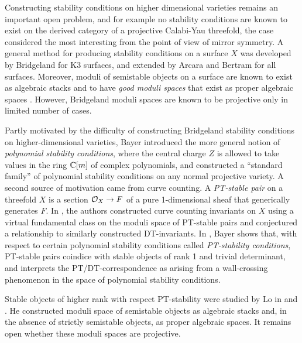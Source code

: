 Constructing stability conditions on higher dimensional varieties remains an important open problem, and for example no stability conditions are known to exist on the derived category of a projective Calabi-Yau threefold, the case considered the most interesting from the point of view of mirror symmetry. A general method for producing stability conditions on a surface $X$ was developed by Bridgeland \cite{bridgelandK3} for K3 surfaces, and extended by Arcara and Bertram \cite{ABL13} for all surfaces. Moreover, moduli of semistable objects on a surface are known to exist as algebraic stacks \cite{toda08} and to have \textit{good moduli spaces} that exist as proper algebraic spaces \cite[Theorem 7.25, Example 7.27]{AHLH}. However, Bridgeland moduli spaces are known to be projective only in limited number of cases.

Partly motivated by the difficulty of constructing Bridgeland stability conditions on higher-dimensional varieties, Bayer \cite{bayer-polynomial} introduced the more general notion of \textit{polynomial stability conditions}, where the central charge $Z$ is allowed to take values in the ring $\mathbb{C}[m]$ of complex polynomials, and constructed a ``standard family'' of polynomial stability conditions on any normal projective variety. A second source of motivation came from curve counting. A \textit{PT-stable pair} on a threefold $X$ is a section $\mathcal{O}_X \to F$ of a pure 1-dimensional sheaf that generically generates $F$. In \cite{PT}, the authors constructed curve counting invariants on $X$ using a virtual fundamental class on the moduli space of PT-stable pairs and conjectured a relationship to similarly constructed DT-invariants. In \cite{bayer-polynomial}, Bayer shows that, with respect to certain polynomial stability conditions called \textit{PT-stability conditions}, PT-stable pairs coindice with stable objects of rank 1 and trivial determinant, and interprets the PT/DT-correspondence as arising from a wall-crossing phenomenon in the space of polynomial stability conditions.

Stable objects of higher rank with respect PT-stability were studied by Lo in \cite{lo-PT1} and \cite{lo-PT2}. He constructed moduli space of semistable objects as algebraic stacks and, in the absence of strictly semistable objects, as proper algebraic spaces. It remains open whether these moduli spaces are projective.

